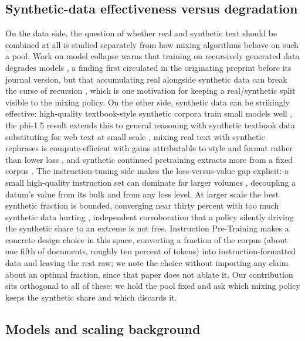 \documentclass{article}
\begin{document}
\subsection{Synthetic-data effectiveness versus degradation}

On the data side, the question of whether real and synthetic text should be combined at all is studied separately from how mixing algorithms behave on such a pool. Work on model collapse warns that training on recursively generated data degrades models \citep{shumailov2024collapse}, a finding first circulated in the originating preprint \citep{shumailov2023curse} before its journal version, but that accumulating real alongside synthetic data can break the curse of recursion \citep{modelcollapse2024}, which is one motivation for keeping a real/synthetic split visible to the mixing policy. On the other side, synthetic data can be strikingly effective: high-quality textbook-style synthetic corpora train small models well \citep{gunasekar2023textbooks}, the phi-1.5 result extends this to general reasoning with synthetic textbook data substituting for web text at small scale \citep{li2023phi15}, mixing real text with synthetic rephrases is compute-efficient with gains attributable to style and format rather than lower loss \citep{maini2024wrap}, and synthetic continued pretraining extracts more from a fixed corpus \citep{yang2024synthetic}. The instruction-tuning side makes the loss-versus-value gap explicit: a small high-quality instruction set can dominate far larger volumes \citep{zhou2023lima}, decoupling a datum's value from its bulk and from any loss level. At larger scale the best synthetic fraction is bounded, converging near thirty percent with too much synthetic data hurting \citep{kang2025demystifying}, independent corroboration that a policy silently driving the synthetic share to an extreme is not free. Instruction Pre-Training \citep{instructpt2024} makes a concrete design choice in this space, converting a fraction of the corpus (about one fifth of documents, roughly ten percent of tokens) into instruction-formatted data and leaving the rest raw; we note the choice without importing any claim about an optimal fraction, since that paper does not ablate it. Our contribution sits orthogonal to all of these: we hold the pool fixed and ask which mixing policy keeps the synthetic share and which discards it.

\subsection{Models and scaling background}
\end{document}
